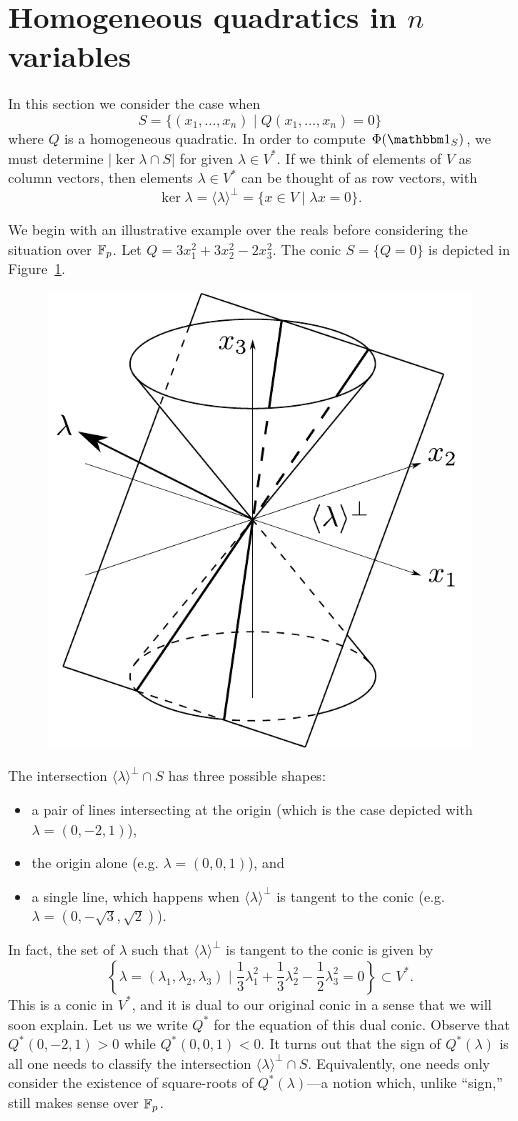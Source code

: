 \section{Homogeneous quadratics in $n$ variables}\label{sec:part1}
In this section we consider the case when
\[
	S = \{(x_1,\ldots,x_n) \mid Q(x_1,\ldots,x_n) = 0\}
\]
where $Q$ is a homogeneous quadratic. In order to compute $\Phi(\IND_S)$, we must determine $|\ker \lambda \cap S|$ for given $\lambda \in V^*$. If we think of elements of $V$ as column vectors, then elements $\lambda \in V^*$ can be thought of as row vectors, with
\[
	\ker \lambda = \langle \lambda \rangle^\bot = \{x \in V \mid \lambda x =0\}.
\]

We begin with an illustrative example over the reals before considering the situation over $\mathbb{F}_p$. Let $Q = 3x_1^2 + 3x_2^2 - 2x_3^2$. The conic $S = \{Q = 0\}$ is depicted in Figure~\ref{fig:conic-with-plane}.
\begin{figure}[h]
	\centering
	\includegraphics[width=0.6\linewidth]{conic-with-plane}
	\caption{}
	\label{fig:conic-with-plane}
\end{figure}
The intersection $\langle \lambda \rangle^\bot \cap S$ has three possible shapes:
\begin{itemize}
	\item a pair of lines intersecting at the origin (which is the case depicted with $\lambda = (0,-2,1)$),
	\item the origin alone (e.g. $\lambda = (0,0,1)$), and
	\item a single line, which happens when $\langle \lambda \rangle^\bot$ is tangent to the conic (e.g. $\lambda = (0,-\sqrt{3},\sqrt{2})$).
\end{itemize}
In fact, the set of $\lambda$ such that $\langle \lambda \rangle^\bot$ is tangent to the conic is given by
\[
	\left\{ \lambda = (\lambda_1,\lambda_2,\lambda_3) \mid \frac{1}{3} \lambda_1^2 + \frac{1}{3} \lambda_2^2 - \frac{1}{2} \lambda_3^2 = 0 \right\} \subset V^*.
\]
This is a conic in $V^*$, and it is dual to our original conic in a sense that we will soon explain. Let us we write $Q^*$ for the equation of this dual conic. Observe that $Q^*(0,-2,1) > 0$ while $Q^*(0,0,1) < 0$. It turns out that the sign of $Q^*(\lambda)$ is all one needs to classify the intersection $\langle \lambda \rangle^\bot \cap S$. Equivalently, one needs only consider the existence of square-roots of $Q^*(\lambda)$---a notion which, unlike ``sign,'' still makes sense over $\mathbb{F}_p$.

